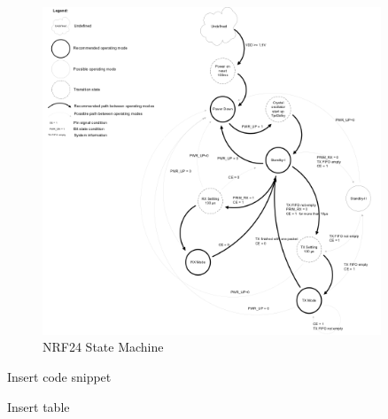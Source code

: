 \begin{figure}
  \vspace{-10pt}
  \begin{center}
    \includegraphics[width=0.9\textwidth, keepaspectratio=true]{images/nrf24_state.png}
  \end{center}
  \caption[\ac{NRF24} State Machine]{\ac{NRF24} State Machine \cite{NRF24Spec}}
  \vspace{-10pt}
\end{figure}

Insert code snippet


Insert table


